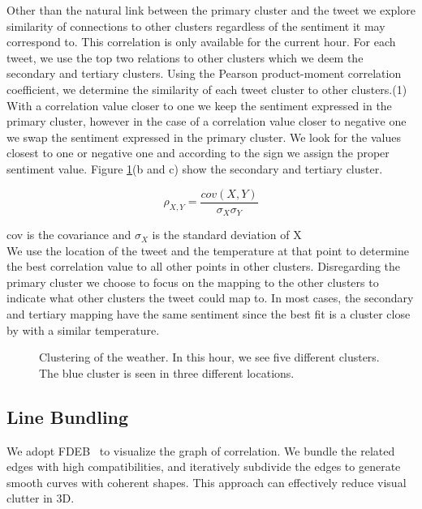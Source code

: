 Other than the natural link between the primary cluster and the tweet we explore similarity of connections to other clusters regardless of the sentiment it may correspond to. This correlation is only available for the current hour. For each tweet, we use the top two relations to other clusters which we deem the secondary and tertiary clusters. Using the Pearson product-moment correlation coefficient, we determine the similarity of each tweet cluster to other clusters.(1) With a correlation value closer to one we keep the sentiment expressed in the primary cluster, however in the case of a correlation value closer to negative one we swap the sentiment expressed in the primary cluster. We look for the values closest to one or negative one and according to the sign we assign the proper sentiment value. Figure \ref{fig:clusters}(b and c) show the secondary and tertiary cluster.

\begin{equation}
\label{eq:pearson}
\rho_{X,Y}=\frac{cov(X,Y)}{\sigma_{X}\sigma_{Y}}
\end{equation}

cov is the covariance and $\sigma_{X}$ is the standard deviation of X \\

We use the location of the tweet and the temperature at that point to determine the best correlation value to all other points in other clusters. Disregarding the primary cluster we choose to focus on the mapping to the other clusters to indicate what other clusters the tweet could map to. In most cases, the secondary and tertiary mapping have the same sentiment since the best fit is a cluster close by with a similar temperature.


\begin{figure}[htp]
  \centering
  \quad
  \quad
\caption{Clustering of the weather. In this hour, we see five different clusters. The blue cluster is seen in three different locations.}
\label{fig:clusters}
\end{figure}

\subsection{Line Bundling}
\label{sec:line}

We adopt FDEB~\cite{holten2009force} to visualize the graph of correlation. We bundle the related edges with high compatibilities, and iteratively subdivide the edges to generate smooth curves with coherent shapes. This approach can effectively reduce visual clutter in 3D.


